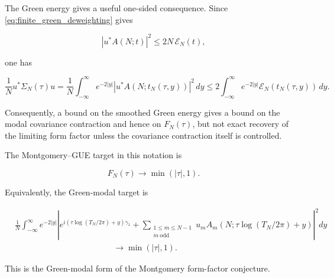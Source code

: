 \documentclass[11pt]{amsart}
\numberwithin{equation}{section}
\theoremstyle{plain}
\theoremstyle{definition}
\theoremstyle{remark}
\begin{document}
The Green energy gives a useful one-sided consequence. Since
\eqref{eq:finite_green_deweighting} gives

\begin{equation}
|u^*A(N;t)|^2
\le
2N\,\mathcal E_N(t),
\end{equation}

one has

\begin{equation}
\frac1N u^*\Sigma_N(\tau)u
=
\frac1N
\int_{-\infty}^{\infty}
e^{-2|y|}
|u^*A(N;t_N(\tau,y))|^2\,dy
\le
2
\int_{-\infty}^{\infty}
e^{-2|y|}
\mathcal E_N(t_N(\tau,y))\,dy.
\label{eq:modal_covariance_controlled_by_green_energy}
\end{equation}

Consequently, a bound on the smoothed Green energy gives a bound on the
modal covariance contraction and hence on \(F_N(\tau)\), but not exact
recovery of the limiting form factor unless the covariance contraction
itself is controlled.

The Montgomery--GUE target in this notation is

\begin{equation}
F_N(\tau)
\longrightarrow
\min(|\tau|,1).
\label{eq:montgomery_form_factor_target}
\end{equation}

Equivalently, the Green-modal target is

\begin{equation}
\begin{aligned}
&
\frac1N
\int_{-\infty}^{\infty}
e^{-2|y|}
\left|
e^{i(\tau\log(T_N/2\pi)+y)\gamma_1}
+
\sum_{\substack{1\le m\le N-1\\ m\ \mathrm{odd}}}
u_mA_m(N;\tau\log(T_N/2\pi)+y)
\right|^2
dy
\\
&\hspace{5cm}
\longrightarrow
\min(|\tau|,1).
\end{aligned}
\label{eq:green_modal_montgomery_target}
\end{equation}

This is the Green-modal form of the Montgomery form-factor conjecture.
\end{document}
